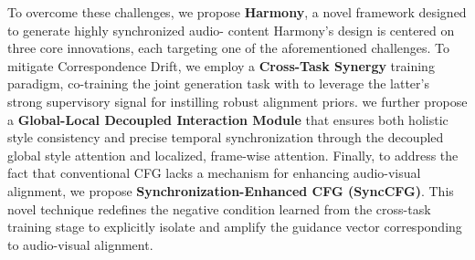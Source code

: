 To overcome these challenges, we propose \textbf{Harmony}, a novel  framework designed to generate highly synchronized audio- content %
Harmony's design is centered on three core innovations, each targeting one of the aforementioned challenges. To mitigate Correspondence Drift, we employ a \textbf{Cross-Task Synergy} training paradigm, co-training the joint generation task with 
 to leverage the latter's strong supervisory signal for instilling robust alignment priors. 
we further propose a \textbf{Global-Local Decoupled Interaction Module} that ensures both holistic style consistency and precise temporal synchronization through the decoupled global style attention and localized,  frame-wise attention. 
Finally, to address the fact that conventional CFG lacks a mechanism for enhancing audio-visual alignment, we propose \textbf{Synchronization-Enhanced CFG (SyncCFG)}. This novel technique redefines the negative condition learned from the cross-task training stage to explicitly isolate and amplify the guidance vector corresponding to audio-visual alignment. 


